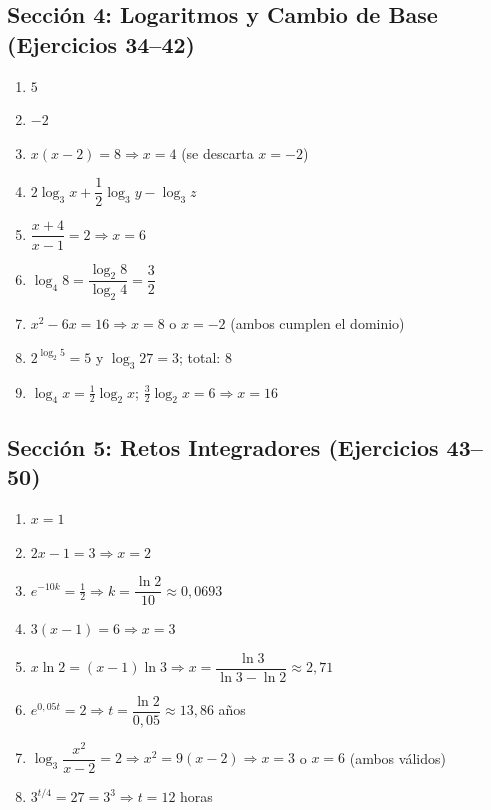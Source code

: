 \documentclass[12pt, letterpaper]{article}
\begin{document}
\subsection*{Sección 4: Logaritmos y Cambio de Base (Ejercicios 34--42)}
\begin{enumerate}[resume=respuestas, leftmargin=*, label=\textbf{\arabic*.}]
  \item $5$
  \item $-2$
  \item $x(x - 2) = 8 \Rightarrow x = 4$ (se descarta $x = -2$)
  \item $2\log_3 x + \dfrac{1}{2}\log_3 y - \log_3 z$
  \item $\dfrac{x + 4}{x - 1} = 2 \Rightarrow x = 6$
  \item $\log_4 8 = \dfrac{\log_2 8}{\log_2 4} = \dfrac{3}{2}$
  \item $x^2 - 6x = 16 \Rightarrow x = 8$ o $x = -2$ (ambos cumplen el dominio)
  \item $2^{\log_2 5} = 5$ y $\log_3 27 = 3$; \quad total: $8$
  \item $\log_4 x = \frac{1}{2}\log_2 x$; \quad $\frac{3}{2}\log_2 x = 6 \Rightarrow x = 16$
\end{enumerate}

\subsection*{Sección 5: Retos Integradores (Ejercicios 43--50)}
\begin{enumerate}[resume=respuestas, leftmargin=*, label=\textbf{\arabic*.}]
  \item $x = 1$
  \item $2x - 1 = 3 \Rightarrow x = 2$
  \item $e^{-10k} = \frac{1}{2} \Rightarrow k = \dfrac{\ln 2}{10} \approx 0{,}0693$
  \item $3(x - 1) = 6 \Rightarrow x = 3$
  \item $x \ln 2 = (x - 1)\ln 3 \Rightarrow x = \dfrac{\ln 3}{\ln 3 - \ln 2} \approx 2{,}71$
  \item $e^{0{,}05t} = 2 \Rightarrow t = \dfrac{\ln 2}{0{,}05} \approx 13{,}86$ años
  \item $\log_3 \dfrac{x^2}{x - 2} = 2 \Rightarrow x^2 = 9(x - 2) \Rightarrow x = 3$ o $x = 6$ (ambos válidos)
  \item $3^{t/4} = 27 = 3^3 \Rightarrow t = 12$ horas
\end{enumerate}
\fi
\end{document}

